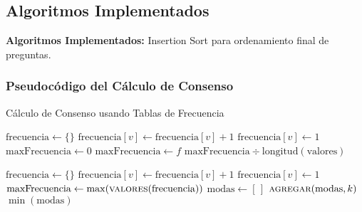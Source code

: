 \documentclass[11pt,a4paper]{article}
\begin{document}
\subsection{Algoritmos Implementados}

\textbf{Algoritmos Implementados:} Insertion Sort para ordenamiento final de preguntas.

\subsubsection{Pseudocódigo del Cálculo de Consenso}

\begin{algorithm}[H]
\caption{Cálculo de Consenso usando Tablas de Frecuencia}
\begin{algorithmic}[1]
    \State $\text{frecuencia} \leftarrow \{\}$ 
     
            \State $\text{frecuencia}[v] \leftarrow \text{frecuencia}[v] + 1$
        \Else
            \State $\text{frecuencia}[v] \leftarrow 1$
        \EndIf
    \EndFor
    \State $\text{maxFrecuencia} \leftarrow 0$
     
            \State $\text{maxFrecuencia} \leftarrow f$
        \EndIf
    \EndFor
    \State \Return $\text{maxFrecuencia} \div \text{longitud}(\text{valores})$ 
\EndProcedure

    \State $\text{frecuencia} \leftarrow \{\}$
            \State $\text{frecuencia}[v] \leftarrow \text{frecuencia}[v] + 1$
        \Else
            \State $\text{frecuencia}[v] \leftarrow 1$
        \EndIf
    \EndFor
    \State $\text{maxFrecuencia} \leftarrow \max(\textsc{valores}(\text{frecuencia}))$
    \State $\text{modas} \leftarrow [\,]$ 
            \State $\textsc{agregar}(\text{modas}, k)$
        \EndIf
    \EndFor
    \State \Return $\min(\text{modas})$ 
\EndProcedure
\end{algorithmic}
\end{algorithm}
\end{document}

